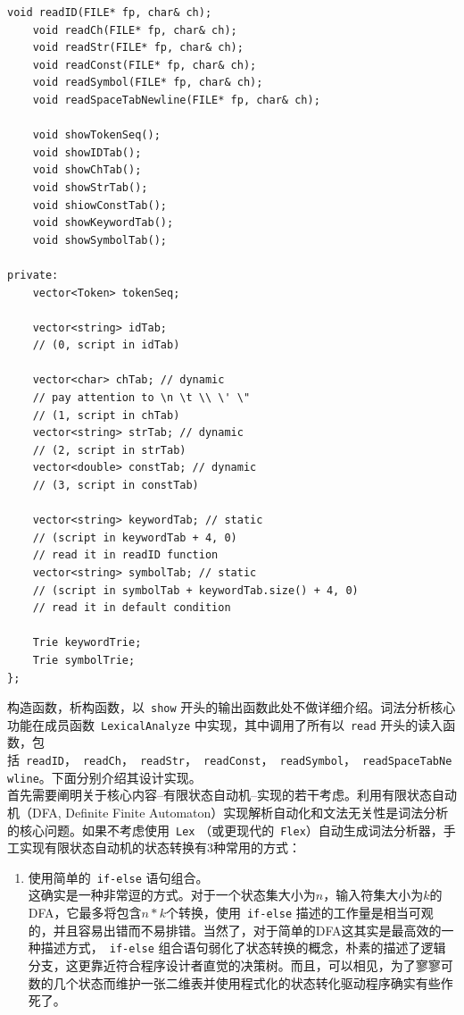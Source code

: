 \documentclass{article}
\begin{document}
\begin{CJK*}{UTF8}{gbsn}
\begin{center}
\begin{lstlisting}[caption = {\texttt{LexicalAnalyzer} 类定义代码清单}, label = {lst: classdeclarationlst}]
	void readID(FILE* fp, char& ch);
	void readCh(FILE* fp, char& ch);
	void readStr(FILE* fp, char& ch);
	void readConst(FILE* fp, char& ch);
	void readSymbol(FILE* fp, char& ch);
	void readSpaceTabNewline(FILE* fp, char& ch);

	void showTokenSeq();
	void showIDTab();
	void showChTab();
	void showStrTab();
	void shiowConstTab();
	void showKeywordTab();
	void showSymbolTab();

private:
	vector<Token> tokenSeq;

	vector<string> idTab;
	// (0, script in idTab)

	vector<char> chTab; // dynamic
	// pay attention to \n \t \\ \' \"
	// (1, script in chTab)
	vector<string> strTab; // dynamic
	// (2, script in strTab)
	vector<double> constTab; // dynamic
	// (3, script in constTab)
	
	vector<string> keywordTab; // static
	// (script in keywordTab + 4, 0)
	// read it in readID function
	vector<string> symbolTab; // static
	// (script in symbolTab + keywordTab.size() + 4, 0)
	// read it in default condition

	Trie keywordTrie;
	Trie symbolTrie;
};
\end{lstlisting}
\end{center}

构造函数，析构函数，以~\texttt{show} 开头的输出函数此处不做详细介绍。词法分析核心功能在成员函数~\texttt{LexicalAnalyze} 中实现，其中调用了所有以~\texttt{read} 开头的读入函数，包括~\texttt{readID}，~\texttt{readCh}，~\texttt{readStr}，~\texttt{readConst}，~\texttt{readSymbol}，~\texttt{readSpaceTabNewline}。下面分别介绍其设计实现。 \\

首先需要阐明关于核心内容--有限状态自动机--实现的若干考虑。利用有限状态自动机（DFA, Definite Finite Automaton）实现解析自动化和文法无关性是词法分析的核心问题。如果不考虑使用~\texttt{Lex} （或更现代的~\texttt{Flex}）自动生成词法分析器，手工实现有限状态自动机的状态转换有3种常用的方式：

\begin{enumerate}
\item 使用简单的~\texttt{if-else} 语句组合。 \\
这确实是一种非常逗的方式。对于一个状态集大小为$n$，输入符集大小为$k$的DFA，它最多将包含$n*k$个转换，使用~\texttt{if-else} 描述的工作量是相当可观的，并且容易出错而不易排错。当然了，对于简单的DFA这其实是最高效的一种描述方式，~\texttt{if-else} 组合语句弱化了状态转换的概念，朴素的描述了逻辑分支，这更靠近符合程序设计者直觉的决策树。而且，可以相见，为了寥寥可数的几个状态而维护一张二维表并使用程式化的状态转化驱动程序确实有些作死了。


\end{enumerate}
\end{CJK*}
\end{document}
